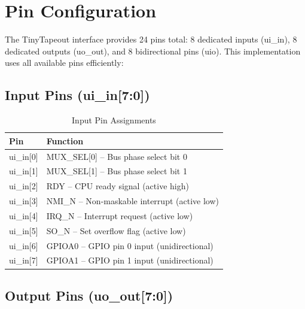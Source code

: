 \documentclass[11pt,a4paper]{article}
\begin{document}
\section{Pin Configuration}

The TinyTapeout interface provides 24 pins total: 8 dedicated inputs (ui\_in), 8 dedicated outputs (uo\_out), and 8 bidirectional pins (uio). This implementation uses all available pins efficiently:

\subsection{Input Pins (ui\_in[7:0])}

\begin{table}[H]
\centering
\begin{tabular}{ll}
\toprule
\textbf{Pin} & \textbf{Function} \\
\midrule
ui\_in[0] & MUX\_SEL[0] -- Bus phase select bit 0 \\
ui\_in[1] & MUX\_SEL[1] -- Bus phase select bit 1 \\
ui\_in[2] & RDY -- CPU ready signal (active high) \\
ui\_in[3] & NMI\_N -- Non-maskable interrupt (active low) \\
ui\_in[4] & IRQ\_N -- Interrupt request (active low) \\
ui\_in[5] & SO\_N -- Set overflow flag (active low) \\
ui\_in[6] & GPIOA0 -- GPIO pin 0 input (unidirectional) \\
ui\_in[7] & GPIOA1 -- GPIO pin 1 input (unidirectional) \\
\bottomrule
\end{tabular}
\caption{Input Pin Assignments}
\end{table}

\subsection{Output Pins (uo\_out[7:0])}
\end{document}
